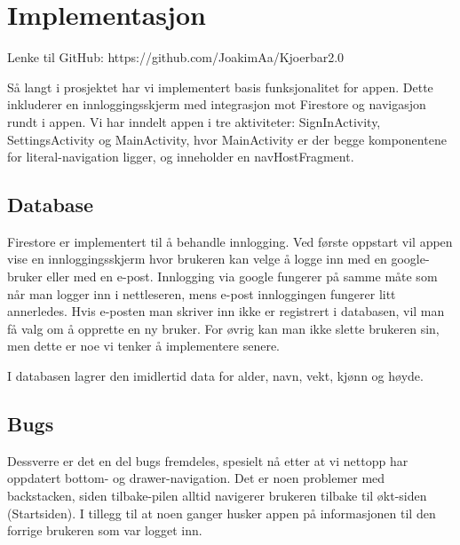 \section{Implementasjon}
Lenke til GitHub: https://github.com/JoakimAa/Kjoerbar2.0

Så langt i prosjektet har vi implementert basis funksjonalitet for appen. Dette inkluderer en innloggingsskjerm med integrasjon mot Firestore og navigasjon rundt i appen. Vi har inndelt appen i tre aktiviteter: SignInActivity, SettingsActivity og MainActivity, hvor MainActivity er der begge komponentene for literal-navigation ligger, og inneholder en navHostFragment. 

\subsection{Database}
Firestore er implementert til å behandle innlogging. Ved første oppstart vil appen vise en innloggingsskjerm hvor brukeren kan velge å logge inn med en google-bruker eller med en e-post. Innlogging via google fungerer på samme måte som når man logger inn i nettleseren, mens e-post innloggingen fungerer litt annerledes. Hvis e-posten man skriver inn ikke er registrert i databasen, vil man få valg om å opprette en ny bruker. For øvrig kan man ikke slette brukeren sin, men dette er noe vi tenker å implementere senere.

I databasen lagrer den imidlertid data for alder, navn, vekt, kjønn og høyde.

\subsection{Bugs}
Dessverre er det en del bugs fremdeles, spesielt nå etter at vi nettopp har oppdatert bottom- og drawer-navigation. Det er noen problemer med backstacken, siden tilbake-pilen alltid navigerer brukeren tilbake til økt-siden (Startsiden). I tillegg til at noen ganger husker appen på informasjonen til den forrige brukeren som var logget inn.


